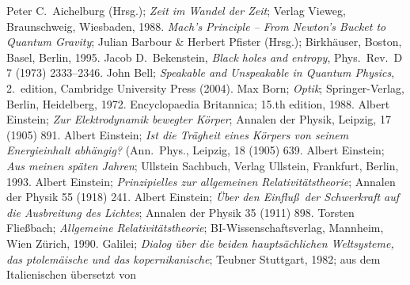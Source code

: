 %


\begin{thebibliography}{99}
 Peter C.\ Aichelburg (Hrsg.); {\it Zeit im 
       Wandel der Zeit}; Verlag Vieweg, Braunschweig, Wiesbaden, 1988.
 {\it Mach's Principle -- From Newton's Bucket to
        Quantum Gravity}; Julian Barbour \& Herbert Pfister (Hrsg.);
        Birkh\"auser, Boston, Basel, Berlin, 1995.       
 Jacob D.\ Bekenstein, \textit{Black holes
          and entropy}, Phys.\ Rev.\ D\,7 (1973) 2333--2346.        
 John Bell;  {\em Speakable and Unspeakable in 
        Quantum Physics}, 2.\ edition, Cambridge University Press (2004).       
 Max Born; {\it Optik}; Springer-Verlag, Berlin, Heidelberg,
        1972.
 Encyclopaedia Britannica; 15.th edition, 1988.
 Albert Einstein; {\it Zur Elektrodynamik bewegter 
        K\"orper}; Annalen der Physik, Leipzig, 17 (1905) 891. 
 Albert Einstein; {\it Ist die Tr\"agheit eines
        K\"orpers von seinem Energieinhalt abh\"angig?} (Ann.\ Phys., 
        Leipzig, 18 (1905) 639.
 Albert Einstein; {\it Aus meinen sp\"aten Jahren};
         Ullstein Sachbuch, Verlag Ullstein, Frankfurt, Berlin, 1993.                 
 Albert Einstein; {\it Prinzipielles zur allgemeinen
        Relativit\"atstheorie}; Annalen der Physik 55 (1918) 241.
 Albert Einstein; {\it \"Uber den Einflu\ss\ der
        Schwerkraft auf die Ausbreitung des Lichtes}; Annalen der
        Physik 35 (1911) 898.                 
 Torsten Flie\ss bach; {\it Allgemeine 
        Relativit\"atstheorie}; BI-Wissenschaftsverlag, Mannheim, Wien
        Z\"urich, 1990. 
 Galilei; {\it Dialog \"uber die beiden haupts\"achlichen
        Weltsysteme, das ptolem\"aische und das kopernikanische}; 
        Teubner Stuttgart, 1982; aus dem Italienischen \"ubersetzt von

\end{thebibliography}
